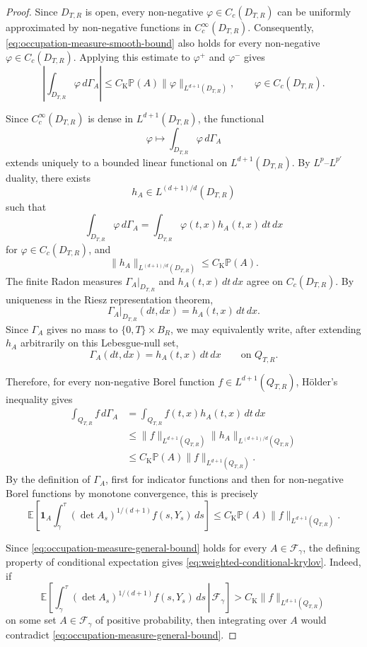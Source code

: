 \documentclass[12pt,oneside, reqno]{amsart}
\numberwithin{equation}{section}
\begin{document}
\begin{proof}
	Since \(D_{T,R}\) is open, every non-negative
	\(\varphi\in C_c(D_{T,R})\) can be uniformly approximated by
	non-negative functions in \(C_c^\infty(D_{T,R})\).
	Consequently, \eqref{eq:occupation-measure-smooth-bound} also holds
	for every non-negative \(\varphi\in C_c(D_{T,R})\).
	Applying this estimate to \(\varphi^+\) and \(\varphi^-\) gives
	\[
	\left|
	\int_{D_{T,R}}\varphi\,d\Gamma_A
	\right|
	\leq
	C_{\mathrm K}\mathbb P(A)
	\|\varphi\|_{L^{d+1}(D_{T,R})},
	\qquad
	\varphi\in C_c(D_{T,R}).
	\]
	
	Since \(C_c^\infty(D_{T,R})\) is dense in
	\(L^{d+1}(D_{T,R})\), the functional
	\[
	\varphi
	\longmapsto
	\int_{D_{T,R}}\varphi\,d\Gamma_A
	\]
	extends uniquely to a bounded linear functional on
	\(L^{d+1}(D_{T,R})\). By
	\(L^p\)--\(L^{p'}\) duality, there exists
	\[
	h_A
	\in
	L^{(d+1)/d}(D_{T,R})
	\]
	such that
	\[
	\int_{D_{T,R}}\varphi\,d\Gamma_A
	=
	\int_{D_{T,R}}
	\varphi(t,x)h_A(t,x)\,dt\,dx
	\]
	for \(\varphi\in C_c(D_{T,R})\), and
	\[
	\|h_A\|_{L^{(d+1)/d}(D_{T,R})}
	\leq
	C_{\mathrm K}\mathbb P(A).
	\]
	The finite Radon measures
	\(\Gamma_A|_{D_{T,R}}\) and
	\(h_A(t,x)\,dt\,dx\) agree on \(C_c(D_{T,R})\).
	By uniqueness in the Riesz representation theorem,
	\[
	\Gamma_A|_{D_{T,R}}(dt,dx)
	=
	h_A(t,x)\,dt\,dx.
	\]
	Since \(\Gamma_A\) gives no mass to
	\(\{0,T\}\times B_R\), we may equivalently write, after extending
	\(h_A\) arbitrarily on this Lebesgue-null set,
	\begin{equation}
		\label{eq:occupation-density}
		\Gamma_A(dt,dx)
		=
		h_A(t,x)\,dt\,dx
		\qquad\text{on }Q_{T,R}.
	\end{equation}
	
	Therefore, for every non-negative Borel function
	\(f\in L^{d+1}(Q_{T,R})\), H\"older's inequality gives
	\[
	\begin{aligned}
		\int_{Q_{T,R}}f\,d\Gamma_A
		&=
		\int_{Q_{T,R}}
		f(t,x)h_A(t,x)\,dt\,dx
		\\
		&\leq
		\|f\|_{L^{d+1}(Q_{T,R})}
		\|h_A\|_{L^{(d+1)/d}(Q_{T,R})}
		\\
		&\leq
		C_{\mathrm K}\mathbb P(A)
		\|f\|_{L^{d+1}(Q_{T,R})}.
	\end{aligned}
	\]
	By the definition of \(\Gamma_A\), first for indicator functions
	and then for non-negative Borel functions by monotone convergence,
	this is precisely
	\begin{equation}
		\label{eq:occupation-measure-general-bound}
		\mathbb E\left[
		\mathbf1_A
		\int_\gamma^\tau
		(\det A_s)^{1/(d+1)}
		f(s,Y_s)\,ds
		\right]
		\leq
		C_{\mathrm K}\mathbb P(A)
		\|f\|_{L^{d+1}(Q_{T,R})}.
	\end{equation}
	
	Since \eqref{eq:occupation-measure-general-bound} holds for every
	\(A\in\mathcal F_\gamma\), the defining property of conditional
	expectation gives
	\eqref{eq:weighted-conditional-krylov}. Indeed, if
	\[
	\mathbb E\left[
	\left.
	\int_\gamma^\tau
	(\det A_s)^{1/(d+1)}
	f(s,Y_s)\,ds
	\,\right|\,
	\mathcal F_\gamma
	\right]
	>
	C_{\mathrm K}
	\|f\|_{L^{d+1}(Q_{T,R})}
	\]
	on some set \(A\in\mathcal F_\gamma\) of positive probability, then
	integrating over \(A\) would contradict
	\eqref{eq:occupation-measure-general-bound}.
\end{proof}
	
\end{document}
